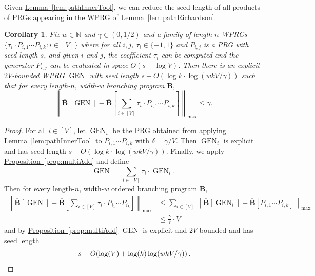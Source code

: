 \documentclass[11pt]{article}
\numberwithin{equation}{section}
\newtheorem{corollary}[theorem]{Corollary}
\theoremstyle{definition}
\theoremstyle{plain}
\newcommand{\N}{\mathbb N}
\newcommand{\expref}[2]{\hyperref[#2]{#1~\ref{#2}}}
\newcommand{\lbar}{\left\|}
\newcommand{\rbar}{\right\|}
\DeclareMathOperator{\gen}{GEN}
\newcommand{\bp}{{\mathbf{B}}}
\newcommand{\bbp}{\overline{\mathbf{B}}}
\begin{document}
Given \expref{Lemma}{lem:pathInnerTool}, we can reduce the seed length of all products of PRGs appearing in the WPRG of \expref{Lemma}{lem:pathRichardson}.
\begin{corollary}\label{cor:pathInner}
Fix $w \in \N$ and $\gamma \in (0,1/2)$ and a family of length $n$ WPRGs $\{\tau_i\cdot P_{i,1}\cdots P_{i,k}:i\in[V]\}$ where for all $i,j$, $\tau_i\in \{-1,1\}$ and $P_{i,j}$ is a PRG with seed length $s$, and given $i$ and $j$, the coefficient $\tau_i$ can be computed and the generator $P_{i,j}$ can be evaluated in space $O(s+\log V)$. Then there is an explicit $2V$-bounded WPRG $\gen$ with seed length $s+O(\log k\cdot \log(wkV/\gamma))$ such that for every length-$n$, width-$w$ branching program $\bp,$
$$\lbar\bbp[\gen] - \bbp\left[\sum_{i\in [V]}\tau_i\cdot P_{i,1}\cdots P_{i,k}\right]\rbar_{\max}\leq \gamma.$$
\end{corollary}
\begin{proof}
For all $i\in [V]$, let $\gen_i$ be the PRG obtained from applying \expref{Lemma}{lem:pathInnerTool} to $P_{i,1}\cdots P_{i,k}$ with $\delta=\gamma/V$. Then $\gen_i$ is explicit and has seed length $s+O(\log k\cdot\log(wkV/\gamma))$.
Finally, we apply \expref{Proposition}{prop:multiAdd} and define
$$\gen=\sum_{i\in [V]} \tau_i\cdot \gen_i.$$ 
Then for every length-$n$, width-$w$ ordered branching program $\bp$,
\begin{align*}
    \lbar\bbp[\gen] - \bbp\left[\sum_{i\in [V]}\tau_i\cdot P_{i_1}\cdots P_{i_k}\right]\rbar_{\max} &\leq  \sum_{i\in [V]}\lbar \bbp[\gen_i] - \bbp\left[P_{i,1}\cdots P_{i,k}\right] \rbar_{\max}\\
    &\leq \frac{\gamma}{V}\cdot V
\end{align*}
and by \expref{Proposition}{prop:multiAdd} $\gen$ is explicit and $2V$-bounded and has seed length
%
\[\ s+O(\log(V)+\log(k)\log(wkV/\gamma))\,.   \qedhere  \]
%
\end{proof}
\end{document}
